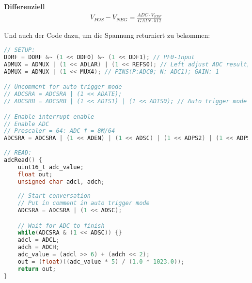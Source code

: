 \textbf{Differenziell}
\begin{align}
    V_{POS} - V_{NEG} = \frac{ADC \cdot V_{REF}}{GAIN \cdot 512}
\end{align}

Und auch der Code dazu, um die Spannung returniert zu bekommen:
\begin{lstlisting}[language=C]
// SETUP:
DDRF = DDRF &~ (1 << DDF0) &~ (1 << DDF1); // PF0-Input
ADMUX = ADMUX | (1 << ADLAR) | (1 << REFS0); // Left adjust ADC result; Voltage reference
ADMUX = ADMUX | (1 << MUX4); // PINS(P:ADC0; N: ADC1); GAIN: 1

// Uncomment for auto trigger mode
// ADCSRA = ADCSRA | (1 << ADATE);	
// ADCSRB = ADCSRB | (1 << ADTS1) | (1 << ADTS0); // Auto trigger mode Taktquelle (Timer0)

// Enable interrupt enable
// Enable ADC
// Prescaler = 64: ADC_f = 8M/64
ADCSRA = ADCSRA | (1 << ADEN) | (1 << ADSC) | (1 << ADPS2) | (1 << ADPS1);
    
// READ:
adcRead() {
    uint16_t adc_value;
    float out;
    unsigned char adcl, adch;
    
    // Start conversation
    // Put in comment in auto trigger mode
    ADCSRA = ADCSRA | (1 << ADSC);

    // Wait for ADC to finish
    while(ADCSRA & (1 << ADSC)) {}
    adcl = ADCL;
    adch = ADCH;
    adc_value = (adcl >> 6) + (adch << 2);
    out = (float)((adc_value * 5) / (1.0 * 1023.0));
    return out;
}
\end{lstlisting}